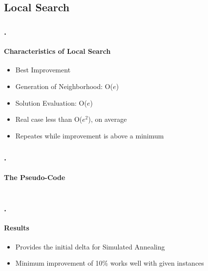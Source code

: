\documentclass{beamer}
\begin{document}
	

   \subsection{Local Search}
   
   \begin{frame}
   \frametitle{\thesection.\thesubsection \ \insertsubsection}
   \framesubtitle{Characteristics of Local Search}
   	
   \begin{itemize}
   	\item Best Improvement
   	\item Generation of Neighborhood: O($e$)
   	\item Solution Evaluation: O($e$)
   	\item Real case less than O($e^2$), on average
   	\item Repeates while improvement is above a minimum
   \end{itemize}
 
\end{frame}

	\begin{frame}
	   \frametitle{\thesection.\thesubsection \ \insertsubsection}
	   \framesubtitle{The Pseudo-Code}
	   	\begin{columns}[onlytextwidth]
\end{columns}
	\end{frame}

\begin{frame}
\frametitle{\thesection.\thesubsection \ \insertsubsection}
\framesubtitle{Results}

\begin{itemize}
	\item Provides the initial delta for Simulated Annealing
	\item Minimum improvement of 10\% works well with given instances
\end{itemize}

\end{frame}
\end{document}
